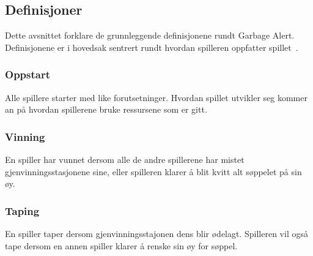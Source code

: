 \subsection{Definisjoner}
Dette avsnittet forklare de grunnleggende definisjonene rundt Garbage
Alert. Definisjonene er i hovedsak sentrert rundt hvordan spilleren
oppfatter spillet~\cite{gameplay}.
\subsubsection{Oppstart}
Alle spillere starter med like forutsetninger. Hvordan spillet utvikler
seg kommer an på hvordan spillerene bruke ressursene som er gitt.
\subsubsection{Vinning}
En spiller har vunnet dersom alle de andre spillerene har mistet
gjenvinningsstasjonene sine, eller spilleren klarer å blit kvitt alt
søppelet på sin øy.
\subsubsection{Taping}
En spiller taper dersom gjenvinningsstajonen dens blir ødelagt. Spilleren
vil også tape dersom en annen spiller klarer å renske sin øy for søppel.

